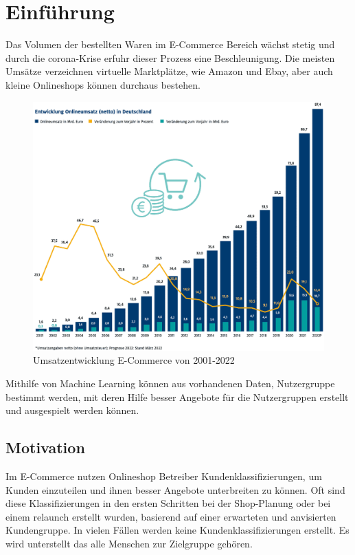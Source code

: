 \chapter{Einführung}
Das Volumen der bestellten Waren im E-Commerce Bereich wächst stetig und durch die \Gls{corona}-Krise erfuhr dieser Prozess eine Beschleunigung. Die meisten Umsätze verzeichnen virtuelle Marktplätze, wie Amazon und Ebay, aber auch kleine Onlineshops können durchaus bestehen.

\begin{figure}[!ht]
	\centering
	\includegraphics[width=\linewidth]{images/chapter1/umsatzprognose_2022.eps}
	\caption{Umsatzentwicklung E-Commerce von 2001-2022 \cite{ecommerce_statistics:versteegen2022}}
	\label{img:stat_prognose_2022}
\end{figure}

Mithilfe von Machine Learning können aus vorhandenen Daten, Nutzergruppe bestimmt werden, mit deren Hilfe besser Angebote für die Nutzergruppen erstellt und ausgespielt werden können.
\section{Motivation}
Im E-Commerce nutzen Onlineshop Betreiber Kundenklassifizierungen, um Kunden einzuteilen und ihnen besser Angebote unterbreiten zu können. Oft sind diese Klassifizierungen in den ersten Schritten bei der Shop-Planung oder bei einem \Gls{relaunch} erstellt wurden, basierend auf einer erwarteten und anvisierten Kundengruppe. In vielen Fällen werden keine Kundenklassifizierungen erstellt. Es wird unterstellt das alle Menschen zur Zielgruppe gehören.

